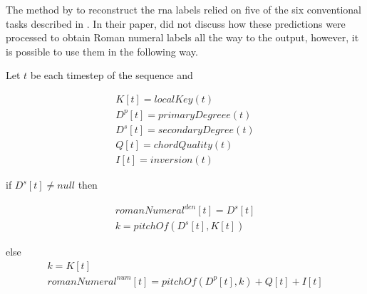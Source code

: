 
The method by \textcite{chen2018functional} to reconstruct
the \gls{rna} labels relied on five of the six conventional
tasks described in . In their
paper, \textcite{chen2018functional} did not discuss how
these predictions were processed to obtain Roman numeral
labels all the way to the output, however, it is possible to
use them in the following way.

Let $t$ be each timestep of the sequence and

\begin{equation}
\begin{split}
K[t] = localKey(t) \\
D^p[t] = primaryDegree e(t) \\
D^s[t] = secondaryDegree(t)  \\
Q[t] = chordQuality(t) \\
I[t] = inversion(t)
\end{split}
\end{equation}

if $D^s[t] \neq null$ then

\begin{equation}
\begin{split}
romanNumeral^{den}[t] = D^s[t] \\
k = pitchOf(D^s[t], K[t])
\end{split}
\end{equation}

else
\begin{equation}
\begin{split}
k = K[t] \\
romanNumeral^{num}[t] = pitchOf(D^p[t], k) + Q[t] + I[t]
\end{split}
\end{equation}
